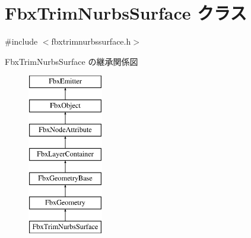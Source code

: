 \hypertarget{class_fbx_trim_nurbs_surface}{}\section{Fbx\+Trim\+Nurbs\+Surface クラス}
\label{class_fbx_trim_nurbs_surface}


{\ttfamily \#include $<$fbxtrimnurbssurface.\+h$>$}

Fbx\+Trim\+Nurbs\+Surface の継承関係図\begin{figure}[H]
\begin{center}
\leavevmode
\includegraphics[height=7.000000cm]{class_fbx_trim_nurbs_surface}
\end{center}
\end{figure}
